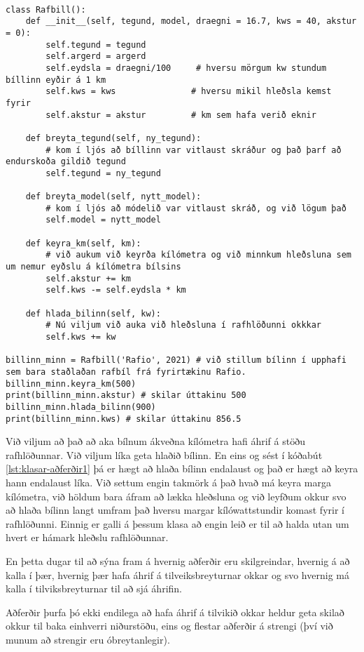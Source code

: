 \begin{lstlisting}[caption=Klasa aðferðir á rafbílaklasa, label=lst:klasar-aðferðir1]

class Rafbill():
	def __init__(self, tegund, model, draegni = 16.7, kws = 40, akstur = 0):
		self.tegund = tegund     
		self.argerd = argerd        
		self.eydsla = draegni/100     # hversu mörgum kw stundum bíllinn eyðir á 1 km
		self.kws = kws               # hversu mikil hleðsla kemst fyrir
		self.akstur = akstur         # km sem hafa verið eknir

	def breyta_tegund(self, ny_tegund):
		# kom í ljós að bíllinn var vitlaust skráður og það þarf að endurskoða gildið tegund
		self.tegund = ny_tegund

	def breyta_model(self, nytt_model):
		# kom í ljós að módelið var vitlaust skráð, og við lögum það
		self.model = nytt_model

	def keyra_km(self, km):
		# við aukum við keyrða kílómetra og við minnkum hleðsluna sem um nemur eyðslu á kílómetra bílsins
		self.akstur += km
		self.kws -= self.eydsla * km  

	def hlada_bilinn(self, kw):
		# Nú viljum við auka við hleðsluna í rafhlöðunni okkkar
		self.kws += kw
		
billinn_minn = Rafbill('Rafio', 2021) # við stillum bílinn í upphafi sem bara staðlaðan rafbíl frá fyrirtækinu Rafio.
billinn_minn.keyra_km(500)
print(billinn_minn.akstur) # skilar úttakinu 500
billinn_minn.hlada_bilinn(900)
print(billinn_minn.kws) # skilar úttakinu 856.5
\end{lstlisting}

Við viljum að það að aka bílnum ákveðna kílómetra hafi áhrif á stöðu rafhlöðunnar.
Við viljum líka geta hlaðið bílinn.
En eins og sést í kóðabút \ref{lst:klasar-aðferðir1} þá er hægt að hlaða bílinn endalaust og það er hægt að keyra hann endalaust líka.
Við settum engin takmörk á það hvað má keyra marga kílómetra, við höldum bara áfram að lækka hleðsluna og við leyfðum okkur svo að hlaða bílinn langt umfram það hversu margar kílówattstundir komast fyrir í rafhlöðunni.
Einnig er galli á þessum klasa að engin leið er til að halda utan um hvert er hámark hleðslu rafhlöðunnar.

En þetta dugar til að sýna fram á hvernig aðferðir eru skilgreindar, hvernig á að kalla í þær, hvernig þær hafa áhrif á tilveiksbreyturnar okkar og svo hvernig má kalla í tilviksbreyturnar til að sjá áhrifin.

Aðferðir þurfa þó ekki endilega að hafa áhrif á tilvikið okkar heldur geta skilað okkur til baka einhverri niðurstöðu, eins og flestar aðferðir á strengi (því við munum að strengir eru óbreytanlegir).

